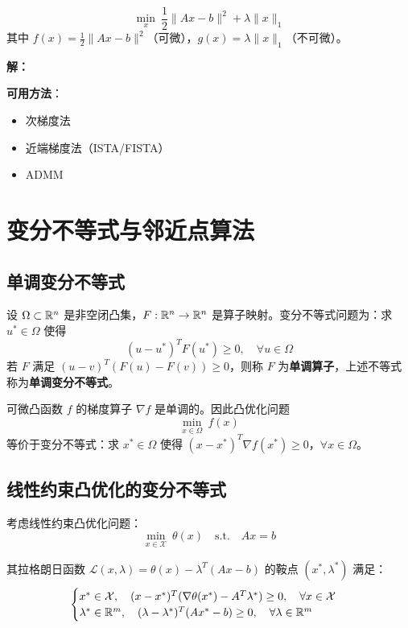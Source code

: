 \begin{example}[LASSO作为复合优化]
\[
\min_x\ \frac{1}{2}\|Ax - b\|^2 + \lambda\|x\|_1
\]
其中 $f(x) = \frac{1}{2}\|Ax - b\|^2$（可微），$g(x) = \lambda\|x\|_1$（不可微）。

\textbf{解：}

\textbf{可用方法}：
\begin{itemize}
    \item 次梯度法
    \item 近端梯度法（ISTA/FISTA）
    \item ADMM
\end{itemize}
\end{example}

\section{变分不等式与邻近点算法}\label{sec:vi-ppa}

\subsection{单调变分不等式}

\begin{definition}[变分不等式（VI）]
设 $\Omega \subset \mathbb{R}^n$ 是非空闭凸集，$F: \mathbb{R}^n \to \mathbb{R}^n$ 是算子映射。变分不等式问题为：求 $u^* \in \Omega$ 使得
\[
(u - u^*)^T F(u^*) \geq 0,\quad \forall u \in \Omega
\]
若 $F$ 满足 $(u - v)^T(F(u) - F(v)) \geq 0$，则称 $F$ 为\textbf{单调算子}，上述不等式称为\textbf{单调变分不等式}。
\end{definition}

\begin{property}[凸函数与变分不等式]
可微凸函数 $f$ 的梯度算子 $\nabla f$ 是单调的。因此凸优化问题
\[
\min_{x \in \Omega}\ f(x)
\]
等价于变分不等式：求 $x^* \in \Omega$ 使得 $(x - x^*)^T \nabla f(x^*) \geq 0$，$\forall x \in \Omega$。
\end{property}

\subsection{线性约束凸优化的变分不等式}

考虑线性约束凸优化问题：
\[
\min_{x \in \mathcal{X}}\ \theta(x)\quad \text{s.t.}\quad Ax = b
\]

其拉格朗日函数 $\mathcal{L}(x, \lambda) = \theta(x) - \lambda^T(Ax - b)$ 的鞍点 $(x^*, \lambda^*)$ 满足：
\[
\begin{cases}
x^* \in \mathcal{X},\quad (x - x^*)^T(\nabla \theta(x^*) - A^T \lambda^*) \geq 0,\quad \forall x \in \mathcal{X} \\
\lambda^* \in \mathbb{R}^m,\quad (\lambda - \lambda^*)^T(Ax^* - b) \geq 0,\quad \forall \lambda \in \mathbb{R}^m
\end{cases}
\]

